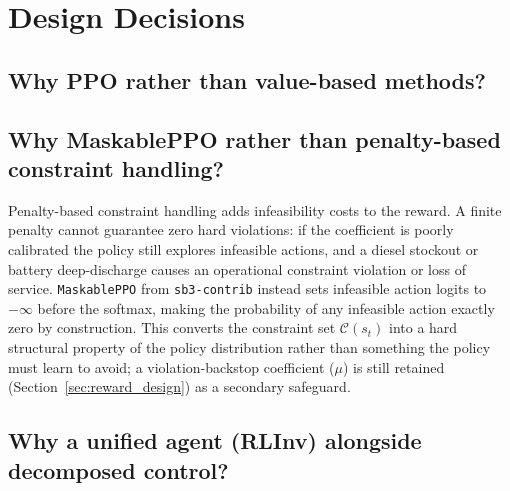 \section{Design Decisions}
\label{sec:rationale}

\subsection{Why PPO rather than value-based methods?}


\subsection{Why MaskablePPO rather than penalty-based constraint handling?}

Penalty-based constraint handling adds infeasibility costs to the reward.
A finite penalty cannot guarantee zero hard violations: if the coefficient
is poorly calibrated the policy still explores infeasible actions, and a
diesel stockout or battery deep-discharge causes an operational constraint
violation or loss of service. \texttt{MaskablePPO} from \texttt{sb3-contrib}
instead sets infeasible action logits to $-\infty$ before the softmax, making
the probability of any infeasible action exactly zero by construction. This
converts the constraint set $\mathcal{C}(s_t)$ into a hard structural
property of the policy distribution rather than something the policy must
learn to avoid; a violation-backstop coefficient ($\mu$) is still retained
(Section~\ref{sec:reward_design}) as a secondary safeguard. 

\subsection{Why a unified agent (RLInv) alongside decomposed control?}


